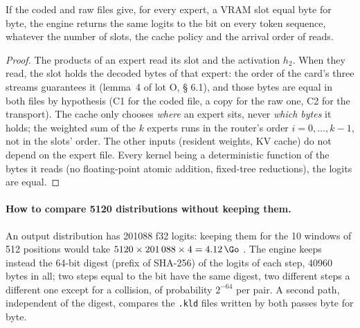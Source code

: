 \begin{proposition}\label{t2res-prop:c3}
If the coded and raw files give, for every expert, a VRAM slot equal byte for byte, the engine returns the same logits to the bit on every token sequence, whatever the number of slots, the cache policy and the arrival order of reads.
\end{proposition}
\begin{proof}
The products of an expert read its slot and the activation $h_2$. When they read, the slot holds the decoded bytes of that expert: the order of the card's three streams guarantees it (lemma~4 of lot O,  § 6.1), and those bytes are equal in both files by hypothesis (C1 for the coded file, a copy for the raw one, C2 for the transport). The cache only chooses \emph{where} an expert sits, never \emph{which bytes} it holds; the weighted sum of the $k$ experts runs in the router's order $i = 0, \dots, k-1$, not in the slots' order. The other inputs (resident weights, KV cache) do not depend on the expert file. Every kernel being a deterministic function of the bytes it reads (no floating-point atomic addition, fixed-tree reductions), the logits are equal.
\end{proof}

\paragraph{How to compare \num{5120} distributions without keeping them.} An output distribution has \num{201088} f32 logits: keeping them for the 10 windows of 512 positions would take $\num{5120} \times \num{201088} \times 4 = \SI{4.12}{\Go}$ \calc. The engine keeps instead the 64-bit digest (prefix of SHA-256) of the logits of each step, \num{40960} bytes in all; two steps equal to the bit have the same digest, two different steps a different one except for a collision, of probability $2^{-64}$ per pair. A second path, independent of the digest, compares the \texttt{.kld} files written by both passes byte for byte.

